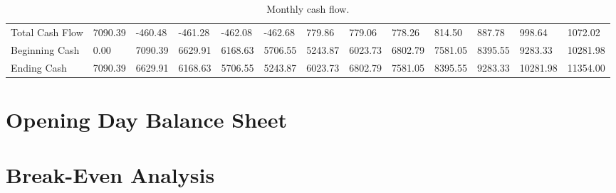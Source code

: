 \begin{sidewaystable}
\begin{table}[H]
\begin{tabularx}{\textwidth}{X X X X X X X X X X X X X}
    \multicolumn{1}{l}{Total Cash Flow} & 7090.39 & -460.48 & -461.28 & -462.08 & -462.68 & 779.86 & 779.06 & 778.26 & 814.50 & 887.78 & 998.64 & 1072.02  \\
    \multicolumn{1}{l}{Beginning Cash} & 0.00 & 7090.39 & 6629.91 & 6168.63 & 5706.55 & 5243.87 & 6023.73 & 6802.79 & 7581.05 & 8395.55 & 9283.33 & 10281.98  \\
    \multicolumn{1}{l}{Ending Cash} & 7090.39 & 6629.91 & 6168.63 & 5706.55 & 5243.87 & 6023.73 & 6802.79 & 7581.05 & 8395.55 & 9283.33 & 10281.98 & 11354.00  \\

  \end{tabularx}
  \caption{Monthly cash flow.}
  \label{table.cash.flow}
\end{table}
\end{sidewaystable}

\section{Opening Day Balance Sheet}

\section{Break-Even Analysis}
